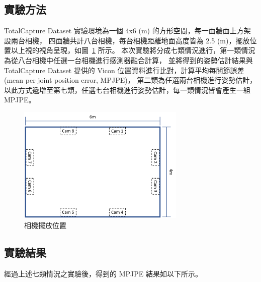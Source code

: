 \subsection{實驗方法}
TotalCapture Dataset 實驗環境為一個 4x6 (m) 的方形空間，每一面牆面上方架設兩台相機，
四面牆共計八台相機，每台相機距離地面高度皆為 2.5 (m)，擺放位置以上視的視角呈現，如圖~\ref{ch3_fig_cameraset_totalcap} 所示。
本次實驗將分成七類情況進行，第一類情況為從八台相機中任選一台相機進行感測器融合計算，
並將得到的姿勢估計結果與 TotalCapture Dataset 提供的 Vicon 位置資料進行比對，計算平均每關節誤差 (mean per joint position error, MPJPE)，
第二類為任選兩台相機進行姿勢估計，以此方式遞增至第七類，任選七台相機進行姿勢估計，每一類情況皆會產生一組 MPJPE。

\begin{figure}[!ht]
   \centering
   \includegraphics[width=8cm]{figure/ch3_fig_cameraset_totalcap.png}
    \caption[相機擺放位置]{相機擺放位置}
    \label{ch3_fig_cameraset_totalcap}
\end{figure}

\subsection{實驗結果}
經過上述七類情況之實驗後，得到的 MPJPE 結果如以下所示。

